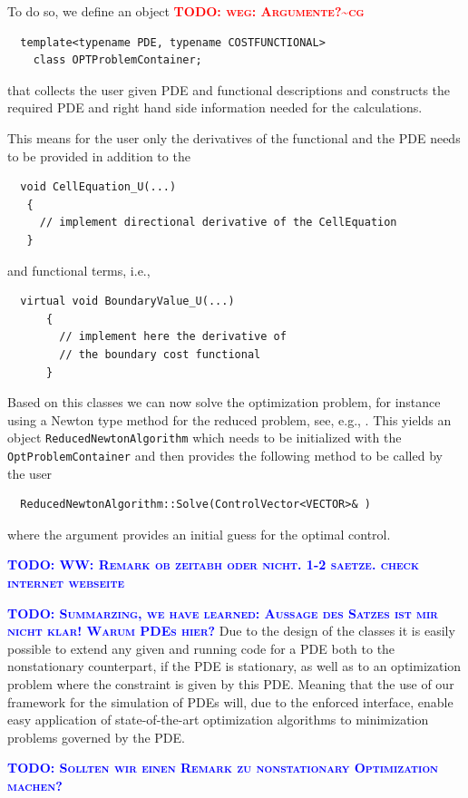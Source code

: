 \documentclass[prodmode,acmtoms]{acmsmall}
\numberwithin{equation}{section}
\newcommand{\todo}[1]{\textbf{\textsc{\textcolor{blue}{TODO: #1}}}}
\newcommand{\todocg}[1]{\textbf{\textsc{\textcolor{red}{TODO: #1\textasciitilde cg}}}}
\begin{document}
To do so, we define an object \todocg{weg: Argumente?}
\begin{lstlisting} 
  template<typename PDE, typename COSTFUNCTIONAL>
    class OPTProblemContainer;
\end{lstlisting}
that collects the user given PDE and functional descriptions and constructs the 
required PDE and right hand side information needed for the calculations.

This means for the user only the derivatives of the functional and the PDE 
needs to be provided in addition to the 
\begin{lstlisting} 
  void CellEquation_U(...)
   {
     // implement directional derivative of the CellEquation
   }
\end{lstlisting}
and functional terms, i.e.,     
\begin{lstlisting} 
  virtual void BoundaryValue_U(...)
      {
        // implement here the derivative of 
        // the boundary cost functional
      }
\end{lstlisting}

Based on this classes we can now solve the optimization problem, for instance using 
a Newton type method for the reduced problem, see, e.g., \cite{NoWr00}. This yields 
an object \texttt{ReducedNewtonAlgorithm} which needs to be initialized 
with the \texttt{OptProblemContainer} and then provides 
the following method to be called by the user
\begin{lstlisting}
  ReducedNewtonAlgorithm::Solve(ControlVector<VECTOR>& )
\end{lstlisting}
where the argument provides an initial guess for the optimal control.

\todo{WW: Remark ob zeitabh oder nicht. 1-2 saetze. 
check internet webseite}

\todo{Summarzing, we have learned: Aussage des Satzes ist mir nicht klar! Warum PDEs hier?}
Due to the design of the classes it is easily possible to extend any given 
and running code for a PDE both to the nonstationary counterpart, if the PDE is 
stationary, as well as to an optimization problem where the constraint is 
given by this PDE. Meaning that the use of our framework for the simulation of 
PDEs will, due to the enforced interface, enable easy application of state-of-the-art 
optimization algorithms to minimization problems governed by the PDE.

\todo{Sollten wir einen Remark zu nonstationary Optimization machen?}
\end{document}
